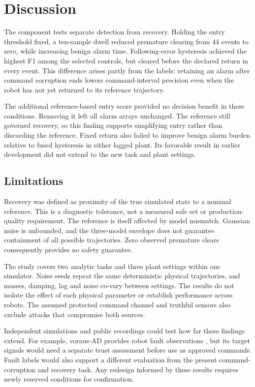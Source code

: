 \section{Discussion}
The component tests separate detection from recovery. Holding the entry threshold fixed, a ten-sample dwell reduced premature clearing from 44 events to zero, while increasing benign alarm time. Following-error hysteresis achieved the highest F1 among the selected controls, but cleared before the declared return in every event. This difference arises partly from the labels: retaining an alarm after command corruption ends lowers command-interval precision even when the robot has not yet returned to its reference trajectory.

The additional reference-based entry score provided no decision benefit in these conditions. Removing it left all alarm arrays unchanged. The reference still governed recovery, so this finding supports simplifying entry rather than discarding the reference. Fixed return also failed to improve benign alarm burden relative to fused hysteresis in either lagged plant. Its favorable result in earlier development did not extend to the new task and plant settings.

\subsection{Limitations}
Recovery was defined as proximity of the true simulated state to a nominal reference. This is a diagnostic tolerance, not a measured safe set or production-quality requirement. The reference is itself affected by model mismatch. Gaussian noise is unbounded, and the three-model envelope does not guarantee containment of all possible trajectories. Zero observed premature clears consequently provides no safety guarantee.

The study covers two analytic tasks and three plant settings within one simulator. Noise seeds repeat the same deterministic physical trajectories, and masses, damping, lag and noise co-vary between settings. The results do not isolate the effect of each physical parameter or establish performance across robots. The assumed protected command channel and truthful sensors also exclude attacks that compromise both sources.

Independent simulations and public recordings could test how far these findings extend. For example, voraus-AD provides robot fault observations \cite{voraus}, but its target signals would need a separate trust assessment before use as approved commands. Fault labels would also support a different evaluation from the present command-corruption and recovery task. Any redesign informed by these results requires newly reserved conditions for confirmation.

